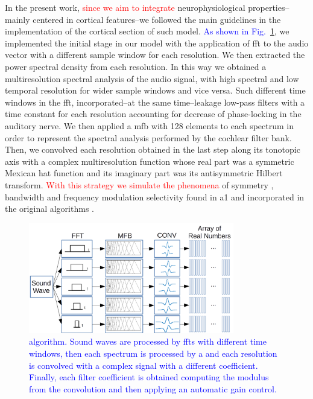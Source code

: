 \documentclass[10pt,letterpaper]{article}
\begin{document}
In the present work, \textcolor{red}{since we aim to integrate} neurophysiological
properties--mainly centered in cortical features--we followed the main guidelines in the implementation of the cortical section of such model. 
\textcolor{blue}{As shown in Fig.~\ref{fig:MRSTSA}}, we implemented the initial stage in our model with the application of \gls{fft} to the audio vector
with a different sample window for each resolution.
We then extracted the power spectral density from each resolution.
In this way we obtained a multiresolution spectral analysis of the audio signal,
with high spectral and low temporal resolution for wider sample windows and
vice versa.
Such different time windows in the \gls{fft},
incorporated--at the same time--leakage low-pass filters with a time constant for each
resolution accounting for decrease of phase-locking in the auditory nerve.
We then applied a \gls{mfb} with 128 elements to each spectrum
in order to represent the spectral analysis performed by the cochlear filter bank.
Then, we convolved each resolution obtained in the last step along its tonotopic axis
with a complex multiresolution function whose real part
was a symmetric Mexican hat function and its imaginary part was its antisymmetric Hilbert transform.
\textcolor{red}{With this strategy we simulate the phenomena} of symmetry \cite{shamma_1993}, bandwidth \cite{schreiner_1990}
and frequency modulation selectivity \cite{shamma_1993,heil_1992,mendelson_1985}
found in \gls{a1} and incorporated in the original algorithms \cite{wang_1995}.

\begin{figure}[h!]
    \centering
    \includegraphics[width=0.8\textwidth]{MRSTSA.png}
    \caption{\textcolor{blue}{ algorithm. Sound waves are processed by \glspl{fft} with different time windows, then each spectrum is processed by
    a  and each resolution is convolved with a complex signal with a different coefficient. Finally, each filter coefficient
    is obtained computing the modulus from the convolution and then applying an automatic gain control.}}
    \label{fig:MRSTSA}
\end{figure}
\end{document}
